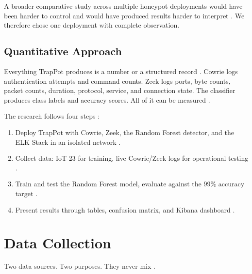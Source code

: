 A broader comparative study across multiple honeypot deployments would have been harder to control and would have produced results harder to interpret \cite{franco2021survey,rodriguezgomez2025systematic}. We therefore chose one deployment with complete observation.

\subsection{Quantitative Approach}
\label{subsec:quantitative}

Everything TrapPot produces is a number or a structured record \cite{9071014,log2evt2025}. Cowrie logs authentication attempts and command counts. Zeek logs ports, byte counts, packet counts, duration, protocol, service, and connection state. The classifier produces class labels and accuracy scores. All of it can be measured \cite{dimauro2021supervised,ahsan2024effects}.

The research follows four steps \cite{lee2021classification,rodriguezgomez2025systematic}:

\begin{enumerate}
\item Deploy TrapPot with Cowrie, Zeek, the Random Forest detector, and the ELK Stack in an isolated network \cite{9359711,commey2025blockchain}.
\item Collect data: IoT-23 for training, live Cowrie/Zeek logs for operational testing \cite{lee2021classification,suareztangil2023stories}.
\item Train and test the Random Forest model, evaluate against the 99\% accuracy target \cite{saied2023comparative,karim2024efficient}.
\item Present results through tables, confusion matrix, and Kibana dashboard \cite{confusion2023pmc,mary2024network}.
\end{enumerate}

\section{Data Collection}
\label{sec:data_collection}

Two data sources. Two purposes. They never mix \cite{rodriguezgomez2025systematic,lanz2025optimizing}.

